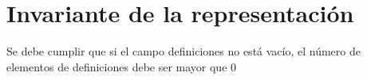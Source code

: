 \hypertarget{repConjunto_invConjunto}{}\section{Invariante de la representación}\label{repConjunto_invConjunto}
Se debe cumplir que si el campo definiciones no está vacío, el número de elementos de definiciones debe ser mayor que 0 